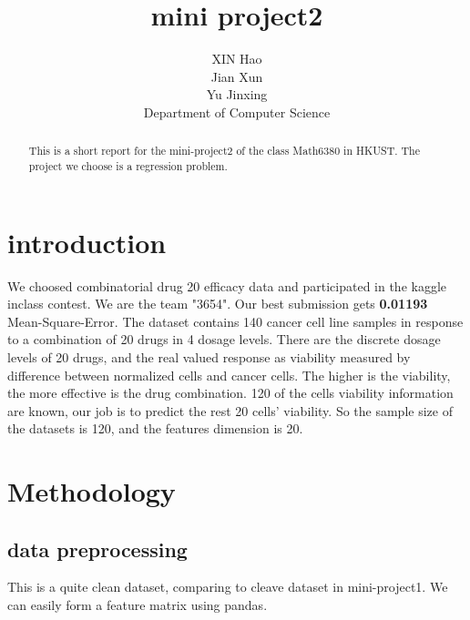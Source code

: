 \documentclass{article}
\title{mini project2}
\author{
  XIN Hao \\
  Jian Xun \\
  Yu Jinxing \\
  Department of Computer Science\\
}
\begin{document}

\maketitle

\begin{abstract}
This is a short report for the mini-project2 of the class Math6380 in HKUST. The project we choose is a regression problem.
\end{abstract}

\section{introduction}
We choosed combinatorial drug 20 efficacy data and participated in the kaggle inclass contest.  We are the team "3654". Our best submission gets \textbf{0.01193} Mean-Square-Error. 
The dataset contains 140 cancer cell line samples in response to a combination of 20 drugs in 4 dosage levels. There are the discrete dosage levels of 20 drugs, and the real valued response as viability measured by difference between normalized cells and cancer cells. The higher is the viability, the more effective is the drug combination. 120 of the cells viability information are known, our job is to predict the rest 20 cells' viability.
So the sample size of the datasets is 120, and the features dimension is 20. 

\section{Methodology}

\subsection{data preprocessing}
This is a quite clean dataset, comparing to cleave dataset in mini-project1. We can easily form a feature matrix using pandas.\\
\end{document}
